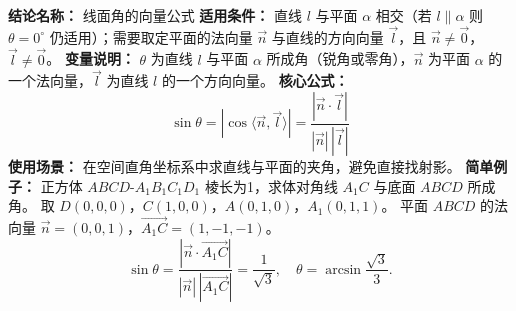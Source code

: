 \textbf{结论名称：} 线面角的向量公式  
\textbf{适用条件：} 直线 \(l\) 与平面 \(\alpha\) 相交（若 \(l\parallel\alpha\) 则 \(\theta=0^\circ\) 仍适用）；需要取定平面的法向量 \(\vec{n}\) 与直线的方向向量 \(\vec{l}\)，且 \(\vec{n}\neq\vec{0}\)，\(\vec{l}\neq\vec{0}\)。  
\textbf{变量说明：} \(\theta\) 为直线 \(l\) 与平面 \(\alpha\) 所成角（锐角或零角），\(\vec{n}\) 为平面 \(\alpha\) 的一个法向量，\(\vec{l}\) 为直线 \(l\) 的一个方向向量。  
\textbf{核心公式：}  
\[
\boxed{\sin\theta = |\cos\langle \vec{n}, \vec{l} \rangle| = \frac{|\vec{n} \cdot \vec{l}|}{|\vec{n}| \, |\vec{l}|}}
\]  
\textbf{使用场景：} 在空间直角坐标系中求直线与平面的夹角，避免直接找射影。  
\textbf{简单例子：} 正方体 \(ABCD\)-\(A_1B_1C_1D_1\) 棱长为1，求体对角线 \(A_1C\) 与底面 \(ABCD\) 所成角。  
取 \(D(0,0,0)\)，\(C(1,0,0)\)，\(A(0,1,0)\)，\(A_1(0,1,1)\)。  
平面 \(ABCD\) 的法向量 \(\vec{n}=(0,0,1)\)，\(\vec{A_1C}=(1,-1,-1)\)。  
\[
\sin\theta=\frac{|\vec{n}\cdot\vec{A_1C}|}{|\vec{n}|\,|\vec{A_1C}|}=\frac{1}{\sqrt{3}},\quad \theta=\arcsin\frac{\sqrt{3}}{3}.
\]